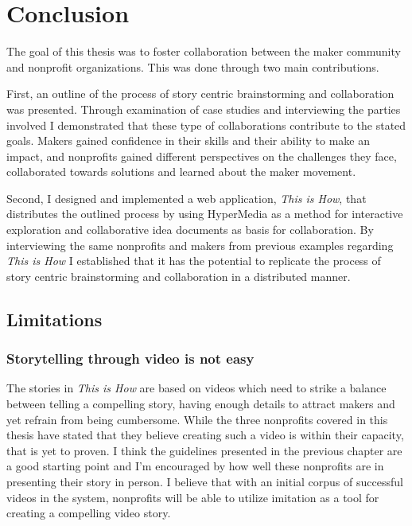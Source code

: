 \chapter{Conclusion}
\label{chap_conclusion}

The goal of this thesis was to foster collaboration between the maker community and nonprofit organizations. This was done through two main contributions. 

First, an outline of the process of story­ centric brainstorming and collaboration was presented. Through examination of case studies and interviewing the parties involved I demonstrated that these type of collaborations contribute to the stated goals. Makers gained confidence in their skills and their ability to make an impact, and nonprofits gained different perspectives on the challenges they face, collaborated towards solutions and learned about the maker movement. 

Second, I designed and implemented a web application, \textit{This is How}, that distributes the outlined process by using HyperMedia as a method for interactive exploration and collaborative idea documents as basis for collaboration. By interviewing the same nonprofits and makers from previous examples regarding \textit{This is How} I established that it has the potential to replicate the process of story­ centric brainstorming and collaboration in a distributed manner.     

\section{Limitations}

\subsection{Storytelling through video is not easy}

The stories in \textit{This is How} are based on videos which need to strike a balance between telling a compelling story, having enough details to attract makers and yet refrain from being cumbersome. While the three nonprofits covered in this thesis have stated that they believe creating such a video is within their capacity, that is yet to proven. I think the guidelines presented in the previous chapter are a good starting point and I'm encouraged by how well these nonprofits are in presenting their story in person. I believe that with an initial corpus of successful videos in the system, nonprofits will be able to utilize imitation as a tool for creating a compelling video story.

